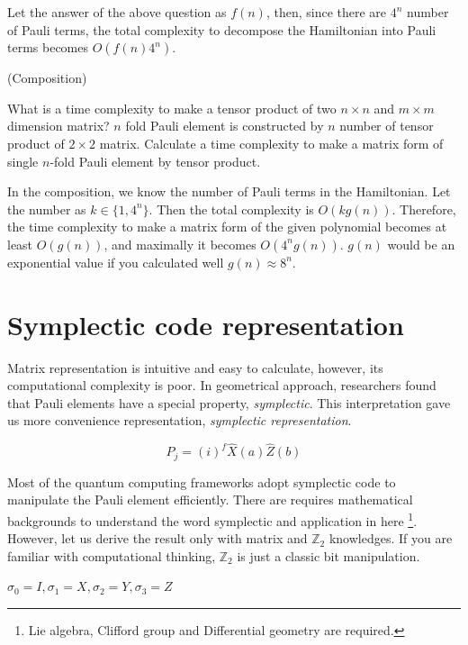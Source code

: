 Let the answer of the above question as $f(n)$, then, since there are $4^n$ number of Pauli terms, 
the total complexity to decompose the Hamiltonian into Pauli terms becomes $O(f(n) 4^n)$.

\begin{exercise}(Composition)

    What is a time complexity to make a tensor product of two $n \times n$ and $m \times m$ dimension matrix?
    $n$ fold Pauli element is constructed by $n$ number of tensor product of $2 \times 2$ matrix.
    Calculate a time complexity to make a matrix form of single $n$-fold Pauli element by tensor product.
\end{exercise}

In the composition, we know the number of Pauli terms in the Hamiltonian.
Let the number as $k\in \{1, 4^n\}$. Then the total complexity is $O(k g(n))$. 
Therefore, the time complexity to make a matrix form of the given polynomial becomes at least $O(g(n))$, and 
maximally it becomes $O(4^n g(n))$. $g(n)$ would be an exponential value if you calculated well $g(n) \approx 8^n$. 

\section{Symplectic code representation}

Matrix representation is intuitive and easy to calculate, however, its computational complexity is poor.
In geometrical approach, researchers found that Pauli elements have a special property, \textit{symplectic}.
This interpretation gave us more convenience representation, \textit{symplectic representation}.

\begin{equation} 
    \label{eq:symplectic_pauli}
    P_j = (i)^f \hat{X}(a) \hat{Z}(b)
\end{equation}

Most of the quantum computing frameworks adopt symplectic code to manipulate the Pauli element efficiently.
There are requires mathematical backgrounds to understand the word symplectic and application in here
\footnote{Lie algebra, Clifford group and Differential geometry are required.}.
However, let us derive the result only with matrix and $\mathbb{Z}_2$ knowledges. 
If you are familiar with computational thinking, $\mathbb{Z}_2$ is just a classic bit manipulation.

$\sigma_0 = I, \sigma_1 = X, \sigma_2 = Y, \sigma_3 = Z$

